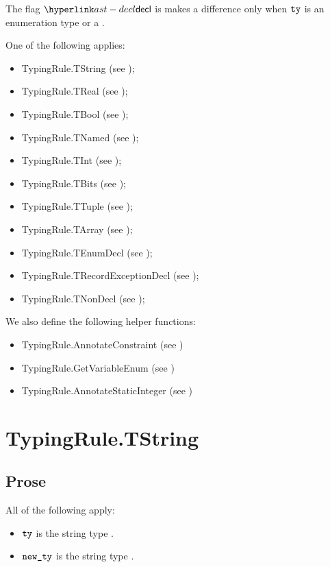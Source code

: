 The flag $\decl$ is makes a difference only when $\texttt{ty}$ is an enumeration type or a \structuredtype.

One of the following applies:
\begin{itemize}
  \item TypingRule.TString (see );
  \item TypingRule.TReal (see );
  \item TypingRule.TBool (see );
  \item TypingRule.TNamed (see );
  \item TypingRule.TInt (see );
  \item TypingRule.TBits (see );
  \item TypingRule.TTuple (see );
  \item TypingRule.TArray (see );
  \item TypingRule.TEnumDecl (see );
  \item TypingRule.TRecordExceptionDecl (see );
  \item TypingRule.TNonDecl (see );
\end{itemize}
\ProseOtherwiseTypeError

We also define the following helper functions:
\begin{itemize}
  \item TypingRule.AnnotateConstraint (see )
  \item TypingRule.GetVariableEnum (see )
  \item TypingRule.AnnotateStaticInteger (see )
\end{itemize}

\section{TypingRule.TString \label{sec:TypingRule.TString}}

\subsection{Prose}
All of the following apply:
\begin{itemize}
  \item $\texttt{ty}$ is the string type \TString.
  \item $\texttt{new\_ty}$ is the string type \TString.
\end{itemize}

